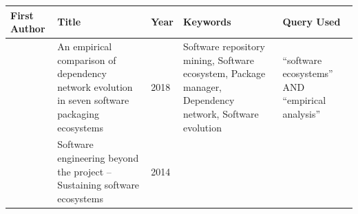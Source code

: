 \documentclass[]{book}
\begin{document}
\begin{longtable}[]{@{}lllll@{}}
\toprule
\begin{minipage}[b]{0.05\columnwidth}\raggedright\strut
First Author\strut
\end{minipage} & \begin{minipage}[b]{0.31\columnwidth}\raggedright\strut
Title\strut
\end{minipage} & \begin{minipage}[b]{0.02\columnwidth}\raggedright\strut
Year\strut
\end{minipage} & \begin{minipage}[b]{0.34\columnwidth}\raggedright\strut
Keywords\strut
\end{minipage} & \begin{minipage}[b]{0.13\columnwidth}\raggedright\strut
Query Used\strut
\end{minipage}\tabularnewline
\midrule
\endhead
\begin{minipage}[t]{0.05\columnwidth}\raggedright\strut
\citet{Decan2018}\strut
\end{minipage} & \begin{minipage}[t]{0.31\columnwidth}\raggedright\strut
An empirical comparison of dependency network evolution in seven
software packaging ecosystems\strut
\end{minipage} & \begin{minipage}[t]{0.02\columnwidth}\raggedright\strut
2018\strut
\end{minipage} & \begin{minipage}[t]{0.34\columnwidth}\raggedright\strut
Software repository mining, Software ecosystem, Package manager,
Dependency network, Software evolution\strut
\end{minipage} & \begin{minipage}[t]{0.13\columnwidth}\raggedright\strut
``software ecosystems'' AND ``empirical analysis''\strut
\end{minipage}\tabularnewline
\begin{minipage}[t]{0.05\columnwidth}\raggedright\strut
\citet{Dittrich2014}\strut
\end{minipage} & \begin{minipage}[t]{0.31\columnwidth}\raggedright\strut
Software engineering beyond the project -- Sustaining software
ecosystems\strut
\end{minipage} & \begin{minipage}[t]{0.02\columnwidth}\raggedright\strut
2014\strut
\end{minipage} & \begin{minipage}[t]{0.34\columnwidth}\raggedright\strut

\end{minipage}
\end{longtable}
\end{document}
